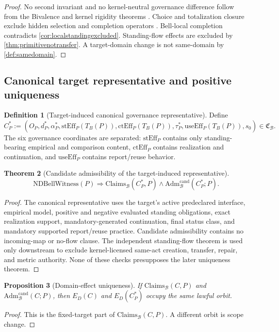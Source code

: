 \documentclass[11pt]{article}
\newtheorem{theorem}{Theorem}[section]
\newtheorem{proposition}[theorem]{Proposition}
\theoremstyle{definition}
\newtheorem{definition}[theorem]{Definition}
\newcommand{\Bell}{\mathcal{B}}
\newcommand{\NDBell}{\mathrm{NDBellWitness}}
\newcommand{\BellConstr}{\mathfrak{C}_{\Bell}}
\newcommand{\AdmBell}{\mathrm{Adm}^{\mathrm{cand}}_{\Bell}}
\newcommand{\ClaimsBell}{\mathrm{Claims}_{\Bell}}
\newcommand{\StandEff}{\mathrm{stEff}_{P}}
\newcommand{\CanonC}{C^{*}_{P}}
\newcommand{\ContEff}{\mathrm{ctEff}_{P}}
\newcommand{\ReuseEff}{\mathrm{useEff}_{P}}
\begin{document}
\begin{proof}
No second invariant and no kernel-neutral governance difference follow from the Bivalence and kernel rigidity theorems \cite{MaleyBivalence2026,MaleyKernel2026}. Choice and totalization closure exclude hidden selection and completion operators \cite{MaleySameScope2026}. Bell-local completion contradicts \cref{cor:localstandingexcluded}. Standing-flow effects are excluded by \cref{thm:primitivenotransfer}. A target-domain change is not same-domain by \cref{def:samedomain}.
\end{proof}

\subsection{Canonical target representative and positive uniqueness}

\begin{definition}[Target-induced canonical governance representative]\label{def:canonicalrepresentative}
Define
\[
\CanonC:=(O_P,d_P^*,\alpha_P^*,\StandEff(T_B(P)),\ContEff(T_B(P)),
\tau_P^*,\ReuseEff(T_B(P)),s_0)\in\BellConstr.
\]
The six governance coordinates are separated: $\StandEff$ contains only standing-bearing empirical and comparison content, $\ContEff$ contains realization and continuation, and $\ReuseEff$ contains report/reuse behavior.
\end{definition}

\begin{theorem}[Candidate admissibility of the target-induced representative]\label{thm:canonicaladmissible}
\[
\NDBell(P)\Longrightarrow
\ClaimsBell(\CanonC,P)\wedge\AdmBell(\CanonC;P).
\]
\end{theorem}
\begin{proof}
The canonical representative uses the target's active predeclared interface, empirical model, positive and negative evaluated standing obligations, exact realization support, mandatory-generated continuation, final status class, and mandatory supported report/reuse practice. Candidate admissibility contains no incoming-map or no-flow clause. The independent standing-flow theorem is used only downstream to exclude kernel-licensed same-act creation, transfer, repair, and metric authority. None of these checks presupposes the later uniqueness theorem.
\end{proof}

\begin{proposition}[Domain-effect uniqueness]\label{prop:domainuniqueness}
If $\ClaimsBell(C,P)$ and $\AdmBell(C;P)$, then $E_D(C)$ and $E_D(\CanonC)$ occupy the same lawful orbit.
\end{proposition}
\begin{proof}
This is the fixed-target part of $\ClaimsBell(C,P)$. A different orbit is scope change.
\end{proof}
\end{document}
